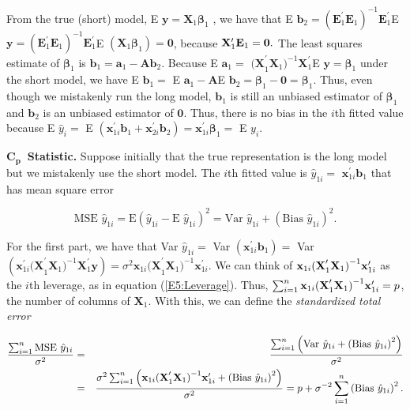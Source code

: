 From the true (short) model, E $\mathbf{y}=\mathbf{X}_{1}\boldsymbol \beta_{1}$%
, we have that E $\mathbf{b}_{2}=(\mathbf{E}_{1}^{\prime }\mathbf{E}%
_{1})^{-1}\mathbf{E}_{1}^{\prime }$E $\mathbf{y}=(\mathbf{E}_{1}^{\prime }%
\mathbf{E}_{1})^{-1}\mathbf{E}_{1}^{\prime }$E
$(\mathbf{X}_{1}\mathbf{\beta
}_{1})=\mathbf{0}$, because $\mathbf{X}_{1}^{\prime }\mathbf{E}_{1}=\mathbf{%
0.}$  The least squares estimate of $\boldsymbol \beta_{1}$ is $\mathbf{b}_{1}=\mathbf{a%
}_{1}-\mathbf{Ab}_{2}$. Because E $\mathbf{a}_{1}=$
$\mathbf{(X}_{1}^{\prime
}\mathbf{X}_{1}\mathbf{)}^{-1}\mathbf{X}_{1}^{\prime }$E
$\mathbf{y}=\boldsymbol \beta_{1}$ under the short model, we have E $\mathbf{b}_{1}=$ E $\mathbf{a}%
_{1}-\mathbf{A}$E $\mathbf{b}_{2}=\boldsymbol
\beta_{1}-\mathbf{0}=\boldsymbol \beta_{1}$. Thus, even though we mistakenly run the long model, $\mathbf{b}%
_{1}$ is still an unbiased estimator of $\boldsymbol \beta_{1}$ and $\mathbf{b}%
_{2}$ is an unbiased estimator of $\mathbf{0}$. Thus, there is no
bias in
the $i$th fitted value because E $\hat{y}_{i}=$ E $(\mathbf{x}_{1i}^{\prime }%
\mathbf{b}_{1}+\mathbf{x}_{2i}^{\prime }\mathbf{b}_{2})=\mathbf{x}%
_{1i}^{\prime }\boldsymbol \beta_{1}=$ E $y_{i}$.

$\mathbf{C}_{\mathbf{p}}$\textbf{\ Statistic.} Suppose initially
that the true representation is the long model but we mistakenly use
the short model.
The $i$th fitted value is $\hat{y}_{1i}=$ $\mathbf{x}_{1i}^{\prime }\mathbf{b%
}_{1}$ that has mean square error
\begin{center}
\[
\text{MSE }\hat{y}_{1i}=\text{E}(\hat{y}_{1i}-\text{E }\hat{y}_{1i})^{2}=%
\text{Var }\hat{y}_{1i}+\left( \text{Bias }\hat{y}_{1i}\right) ^{2}.
\]
\end{center}
For the first part, we have that Var $\hat{y}_{1i}=$ Var  $\left( \mathbf{x}%
_{1i}^{\prime }\mathbf{b}_{1}\right) =$ Var $\left( \mathbf{x}_{1i}^{\prime }%
\mathbf{(X}_{1}^{\prime
}\mathbf{X}_{1}\mathbf{)}^{-1}\mathbf{X}_{1}^{\prime
}\mathbf{y}\right) =\sigma ^{2}\mathbf{x}_{1i}\mathbf{(X}_{1}^{\prime }%
\mathbf{X}_{1}\mathbf{)}^{-1}\mathbf{x}_{1i}^{\prime }$. We can think of $%
\mathbf{x}_{1i}\mathbf{(X}_{1}^{\prime }\mathbf{X}_{1}\mathbf{)}^{-1}\mathbf{%
x}_{1i}^{\prime }$ as the $i$th leverage, as in equation
(\ref{E5:Leverage}). Thus, $\sum_{i=1}^{n}\mathbf{x}_{1i}\mathbf{%
(X}_{1}^{\prime
}\mathbf{X}_{1}\mathbf{)}^{-1}\mathbf{x}_{1i}^{\prime }=p$, the
number of columns of $\mathbf{X}_{1}$. With this, we can define the
\textit{standardized total error}

\begin{center}
\begin{eqnarray*}
\frac{\sum_{i=1}^{n}\text{MSE }\hat{y}_{1i}}{\sigma ^{2}} &=&\frac{%
\sum_{i=1}^{n}\left( \text{Var }\hat{y}_{1i}+\left( \text{Bias }\hat{y}%
_{1i}\right) ^{2}\right) }{\sigma ^{2}} \\
&=&\frac{\sigma ^{2}\sum_{i=1}^{n}\left( \mathbf{x}_{1i}\mathbf{(X}%
_{1}^{\prime }\mathbf{X}_{1}\mathbf{)}^{-1}\mathbf{x}_{1i}^{\prime
}+\left( \text{Bias }\hat{y}_{1i}\right) ^{2}\right) }{\sigma
^{2}}=p+\sigma ^{-2}\sum_{i=1}^{n}\left( \text{Bias
}\hat{y}_{1i}\right) ^{2}.
\end{eqnarray*}
\end{center}

